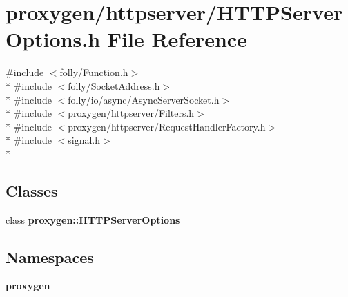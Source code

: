 \section{proxygen/httpserver/\+H\+T\+T\+P\+Server\+Options.h File Reference}
\label{HTTPServerOptions_8h}
{\ttfamily \#include $<$folly/\+Function.\+h$>$}\\*
{\ttfamily \#include $<$folly/\+Socket\+Address.\+h$>$}\\*
{\ttfamily \#include $<$folly/io/async/\+Async\+Server\+Socket.\+h$>$}\\*
{\ttfamily \#include $<$proxygen/httpserver/\+Filters.\+h$>$}\\*
{\ttfamily \#include $<$proxygen/httpserver/\+Request\+Handler\+Factory.\+h$>$}\\*
{\ttfamily \#include $<$signal.\+h$>$}\\*
\subsection*{Classes}
\begin{DoxyCompactItemize}
\item 
class {\bf proxygen\+::\+H\+T\+T\+P\+Server\+Options}
\end{DoxyCompactItemize}
\subsection*{Namespaces}
\begin{DoxyCompactItemize}
\item 
 {\bf proxygen}
\end{DoxyCompactItemize}
